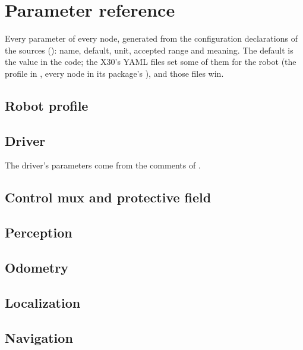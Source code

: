 \chapter{Parameter reference}
\label{ch:t-reference}

Every parameter of every node, generated from the configuration declarations of the sources
(): name, default, unit, accepted range and meaning. The default is
the value in the code; the X30's YAML files set some of them for the robot (the profile in
, every node in its package's ), and those
files win. \readonlynote

\section{Robot profile}


\section{Driver}
The driver's parameters come from the comments of .


\section{Control mux and protective field}


\section{Perception}


\section{Odometry}


\section{Localization}


\section{Navigation}


